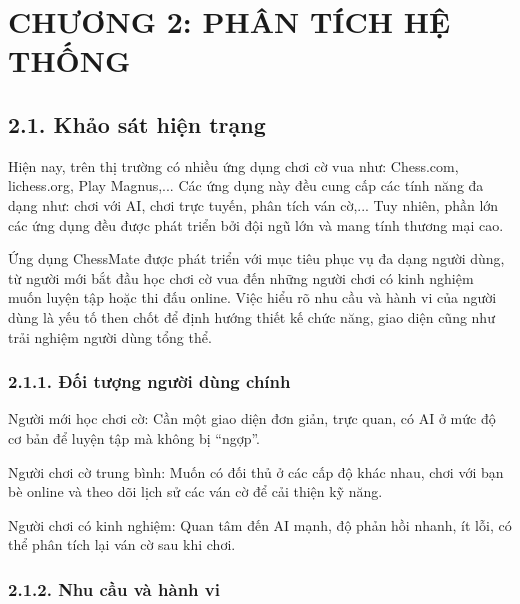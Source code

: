 \documentclass[a4paper,12pt]{article}
\begin{document}
\section*{\centering \textbf{CHƯƠNG 2: PHÂN TÍCH HỆ THỐNG}} %

\subsection*{2.1. Khảo sát hiện trạng}

\justify
\noindent Hiện nay, trên thị trường có nhiều ứng dụng chơi cờ vua như: Chess.com, lichess.org, Play Magnus,... Các ứng dụng này đều cung cấp các tính năng đa dạng như: chơi với AI, chơi trực tuyến, phân tích ván cờ,... Tuy nhiên, phần lớn các ứng dụng đều được phát triển bởi đội ngũ lớn và mang tính thương mại cao.

\noindent Ứng dụng ChessMate được phát triển với mục tiêu phục vụ đa dạng người dùng, từ người mới bắt đầu học chơi cờ vua đến những người chơi có kinh nghiệm muốn luyện tập hoặc thi đấu online. Việc hiểu rõ nhu cầu và hành vi của người dùng là yếu tố then chốt để định hướng thiết kế chức năng, giao diện cũng như trải nghiệm người dùng tổng thể.

\subsubsection*{2.1.1. Đối tượng người dùng chính}%

\noindent Người mới học chơi cờ: Cần một giao diện đơn giản, trực quan, có AI ở mức độ cơ bản để luyện tập mà không bị ``ngợp''.

\noindent Người chơi cờ trung bình: Muốn có đối thủ ở các cấp độ khác nhau, chơi với bạn bè online và theo dõi lịch sử các ván cờ để cải thiện kỹ năng.

\noindent Người chơi có kinh nghiệm: Quan tâm đến AI mạnh, độ phản hồi nhanh, ít lỗi, có thể phân tích lại ván cờ sau khi chơi.

\subsubsection*{2.1.2. Nhu cầu và hành vi}%
\end{document}
